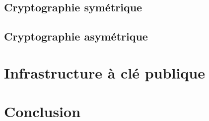 				
				
				
				
				
				
				
		\subsection{Cryptographie symétrique}
			
		\subsection{Cryptographie asymétrique}
	
	\section{Infrastructure à clé publique}
	
			
\section*{Conclusion}
